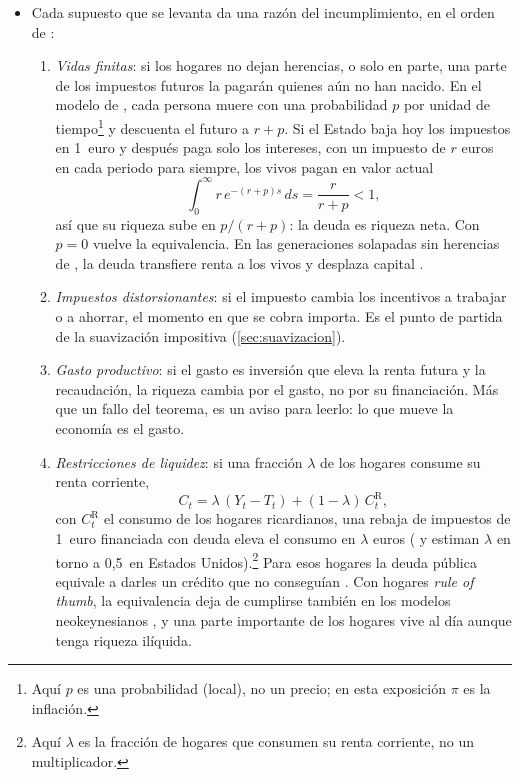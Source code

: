 \documentclass[11pt]{article}
\begin{document}
\begin{itemize}
\item Cada supuesto que se levanta da una razón del incumplimiento, en el orden de \textcite{Heijdra2017Foundations}:
  \begin{enumerate}
  \item \emph{Vidas finitas}: si los hogares no dejan herencias, o solo en parte, una parte de los impuestos futuros la pagarán quienes aún no han nacido. En el modelo de \textcite{Blanchard1985Debt}, cada persona muere con una probabilidad $p$ por unidad de tiempo\footnote{Aquí $p$ es una probabilidad (local), no un precio; en esta exposición $\pi$ es la inflación.} y descuenta el futuro a $r+p$. Si el Estado baja hoy los impuestos en 1~euro y después paga solo los intereses, con un impuesto de $r$ euros en cada periodo para siempre, los vivos pagan en valor actual
    \begin{equation*}
    \int_0^{\infty}r\,e^{-(r+p)s}\,ds=\frac{r}{r+p}<1,
    \end{equation*}
    así que su riqueza sube en $p/(r+p)$: la deuda es riqueza neta. Con $p=0$ vuelve la equivalencia. En las generaciones solapadas sin herencias de \textcite{Diamond1965National}, la deuda transfiere renta a los vivos y desplaza capital .
  \item \emph{Impuestos distorsionantes}: si el impuesto cambia los incentivos a trabajar o a ahorrar, el momento en que se cobra importa. Es el punto de partida de la suavización impositiva (\ref{sec:suavizacion}).
  \item \emph{Gasto productivo}: si el gasto es inversión que eleva la renta futura y la recaudación, la riqueza cambia por el gasto, no por su financiación. Más que un fallo del teorema, es un aviso para leerlo: lo que mueve la economía es el gasto.
  \item \emph{Restricciones de liquidez}: si una fracción $\lambda$ de los hogares consume su renta corriente\nocite{CampbellMankiw1989Consumption},
    \begin{equation*}
    C_t=\lambda\,(Y_t-T_t)+(1-\lambda)\,C^{\mathrm R}_t,
    \end{equation*}
    con $C^{\mathrm R}_t$ el consumo de los hogares ricardianos, una rebaja de impuestos de 1~euro financiada con deuda eleva el consumo en $\lambda$ euros ( y  estiman $\lambda$ en torno a 0,5~en Estados Unidos).\footnote{Aquí $\lambda$ es la fracción de hogares que consumen su renta corriente, no un multiplicador.} Para esos hogares la deuda pública equivale a darles un crédito que no conseguían . Con hogares \emph{rule of thumb}, la equivalencia deja de cumplirse también en los modelos neokeynesianos\nocite{GaliLopezSalidoValles2007} , y una parte importante de los hogares vive al día aunque tenga riqueza ilíquida\nocite{KaplanViolanteWeidner2014Wealthy}.

\end{enumerate}
\end{itemize}
\end{document}
